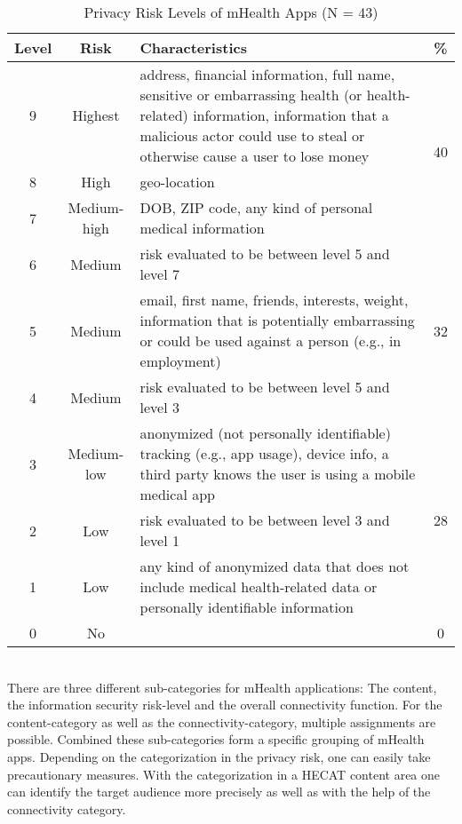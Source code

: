 \begin{table}[!htb]
    \center
    \begin{tabular}{c | c | p{22.5em} | c}
        \textbf{Level} & \textbf{Risk} & \textbf{Characteristics} & \textbf{\%}\\
        \hline
        9 & Highest & address, financial information, full name, sensitive or embarrassing health (or health-related) information, information that a malicious actor could use to steal or otherwise cause a user to lose money & \multirow{3}[20]{*}{40} \\
        \cline{1-3}
        8 & High & geo-location & \\
        \cline{1-3}
        7 & Medium-high & DOB, ZIP code, any kind of personal medical
information & \\
        \hline
        6 & Medium & risk evaluated to be between level 5 and level 7 & \multirow{3}[12]{*}{32} \\
        \cline{1-3}
        5 & Medium & email, first name, friends, interests, weight, information that is potentially embarrassing or could be used against a person (e.g., in employment)\\
        \cline{1-3}
        4 & Medium & risk evaluated to be between level 5 and level 3\\
        \hline
        3 & Medium-low & anonymized (not personally identifiable) tracking (e.g., app usage), device info, a third party knows the user is using a mobile medical app & \multirow{3}[22]{*}{28} \\
        \cline{1-3}
        2 & Low & risk evaluated to be between level 3 and level 1\\
        \cline{1-3}
        1 & Low & any kind of anonymized data that does not include medical
health-related data or personally identifiable information\\
        \hline
        0 & No & & 0 \\
    \end{tabular}
    \caption[Privacy Risk Levels of mHealth Apps]{Privacy Risk Levels of mHealth Apps (N = 43)\footnotemark}
    \label{tab:RiskLevelsmHealth}
\end{table}
\\
There are three different sub-categories for mHealth applications: The content, the information security risk-level and the overall connectivity function. For the content-category as well as the connectivity-category, multiple assignments are possible. Combined these sub-categories form a specific grouping of mHealth apps. Depending on the categorization in the privacy risk, one can easily take precautionary measures. With the categorization in a HECAT content area one can identify the target audience more precisely as well as with the help of the connectivity category.

